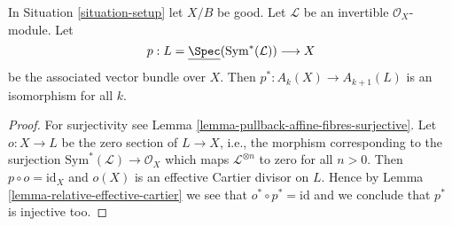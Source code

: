 \begin{lemma}
\label{lemma-linebundle}
In Situation \ref{situation-setup} let $X/B$ be good.
Let $\mathcal{L}$ be an invertible $\mathcal{O}_X$-module.
Let
$$
p :
L = \underline{\Spec}(\text{Sym}^*(\mathcal{L}))
\longrightarrow
X
$$
be the associated vector bundle over $X$.
Then $p^* : A_k(X) \to A_{k + 1}(L)$ is an isomorphism for all $k$.
\end{lemma}

\begin{proof}
For surjectivity see Lemma \ref{lemma-pullback-affine-fibres-surjective}.
Let $o : X \to L$ be the zero section of $L \to X$, i.e., the morphism
corresponding to the surjection $\text{Sym}^*(\mathcal{L}) \to \mathcal{O}_X$
which maps $\mathcal{L}^{\otimes n}$ to zero for all $n > 0$.
Then $p \circ o = \text{id}_X$ and $o(X)$ is an effective
Cartier divisor on $L$. Hence by Lemma \ref{lemma-relative-effective-cartier}
we see that $o^* \circ p^* = \text{id}$ and we conclude that $p^*$ is
injective too.
\end{proof}






















